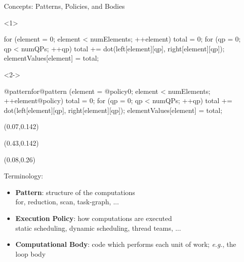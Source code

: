 \begin{frame}[fragile]{Concepts: Patterns, Policies, and Bodies}

  \begin{onlyenv}<1>
  \begin{code}[linebackgroundcolor={
      }
    ]
for (element = 0; element < numElements; ++element) {
  total = 0;
  for (qp = 0; qp < numQPs; ++qp) {
    total += dot(left[element][qp], right[element][qp]);
  }
  elementValues[element] = total;
}
  \end{code}
  \end{onlyenv}

  \begin{onlyenv}<2->
  \begin{code}[linebackgroundcolor={
        \btLstHL<2>{2-6}{bodyColor}
      }
    ]
@patternfor@pattern (element = @policy0; element < numElements; ++element@policy) {
  total = 0;
  for (qp = 0; qp < numQPs; ++qp) {
    total += dot(left[element][qp], right[element][qp]);
  }
  elementValues[element] = total;
}
  \end{code}
  \end{onlyenv}

  \begin{textblock*}{0.5\textwidth}(0.07\textwidth,0.142\textheight)
  \end{textblock*}

  \begin{textblock*}{0.5\textwidth}(0.43\textwidth,0.142\textheight)
  \end{textblock*}

  \begin{textblock*}{0.5\textwidth}(0.08\textwidth,0.26\textheight)
  \end{textblock*}

  \vspace{0pt}
  \pause

  Terminology:
  \begin{itemize}
    \item{\textbf{Pattern}}: structure of the computations \\
     \hspace{20pt} for, reduction, scan, task-graph, ...
   \item{\textbf{Execution Policy}}: how computations are executed \\
     \hspace{20pt} static scheduling, dynamic scheduling, thread teams, ...
   \item{\textbf{Computational Body}}: code which performs each unit of work; \textit{e.g.}, the loop body \\
  \end{itemize}


\end{frame}
